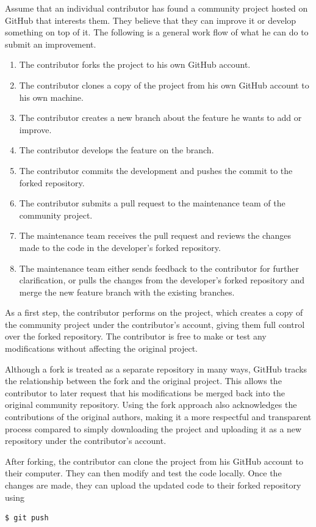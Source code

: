 Assume that an individual contributor has found a community project hosted on GitHub that interests them. They believe that they can improve it or develop something on top of it. The following is a general work flow of what he can do to submit an improvement.
\begin{enumerate}
	\item The contributor forks the project to his own GitHub account.
	\item The contributor clones a copy of the project from his own GitHub account to his own machine.
	\item The contributor creates a new branch about the feature he wants to add or improve.
	\item The contributor develops the feature on the branch.
	\item The contributor commits the development and pushes the commit to the forked repository.
	\item The contributor submits a pull request to the maintenance team of the community project.
	\item The maintenance team receives the pull request and reviews the changes made to the code in the developer's forked repository.
	\item The maintenance team either sends feedback to the contributor for further clarification, or pulls the changes from the developer's forked repository and merge the new feature branch with the existing branches.
\end{enumerate}

As a first step, the contributor performs  on the project, which creates a copy of the community project under the contributor’s account, giving them full control over the forked repository. The contributor is free to make or test any modifications without affecting the original project.

Although a fork is treated as a separate repository in many ways, GitHub tracks the relationship between the fork and the original project. This allows the contributor to later request that his modifications be merged back into the original community repository. Using the fork approach also acknowledges the contributions of the original authors, making it a more respectful and transparent process compared to simply downloading the project and uploading it as a new repository under the contributor's account.

After forking, the contributor can clone the project from his GitHub account to their computer. They can then modify and test the code locally. Once the changes are made, they can upload the updated code to their forked repository using
\begin{lstlisting}
$ git push
\end{lstlisting}

